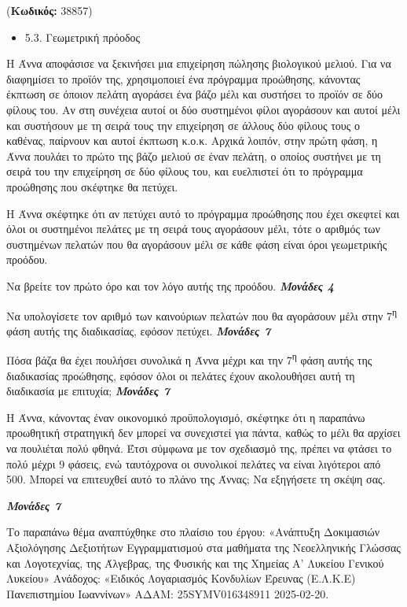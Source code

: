 \documentclass[11pt,a4paper,twoside]{book}
\newcounter{askhsh}[chapter]
\renewcommand{\theaskhsh}{
	\bf{\titlefont{\Large{\thechapter}}.\arabic{askhsh}}
}
\newcommand{\Askhsh}[2]{\refstepcounter{askhsh}{\titlefont{Άσκηση\theaskhsh} - \textcolor{maincolor}{ΘΕΜΑ #2}} ({\small{\textbf{Κωδικός:} #1}})\\}{}
\newenvironment{ylh}{
\begin{tcolorbox}[
breakable,
enhanced standard,
titlerule=0pt,
toprule=0pt, 
rightrule=0pt, 
bottomrule=0pt,
title={\titlefont Ύλη άσκησης},
colback=white,
opacityback=0,
left=2mm,
top=1mm,
bottom=0mm,
boxrule=0pt,
colframe=white,
borderline west={1.5mm}{0pt}{secondarycolor},
leftrule=2mm,
sharp corners,
coltitle=black
]
\begin{itemize}[leftmargin=3mm, itemsep=0mm, label=\textcolor{secondarycolor}{{\small\faBook}}]
}{
\end{itemize}
\end{tcolorbox}
}
\newcommand{\monades}[1]{
\hspace*{\fill}
\textbf{\textit{\textcolor{maincolor}{Μονάδες #1}}}}
\begin{document}
\vspace{4mm}
\Askhsh{38857}{4}
\begin{ylh}
    \item 5.3. Γεωμετρική πρόοδος
\end{ylh}

Η Άννα αποφάσισε να ξεκινήσει μια επιχείρηση πώλησης βιολογικού μελιού. Για να διαφημίσει το προϊόν της, χρησιμοποιεί ένα πρόγραμμα προώθησης, κάνοντας έκπτωση σε όποιον πελάτη αγοράσει ένα βάζο μέλι και συστήσει το προϊόν σε δύο φίλους του. Αν στη συνέχεια αυτοί οι δύο συστημένοι φίλοι αγοράσουν και αυτοί μέλι και συστήσουν με τη σειρά τους την επιχείρηση σε άλλους δύο φίλους τους ο καθένας, παίρνουν και αυτοί έκπτωση κ.ο.κ. Αρχικά λοιπόν, στην πρώτη φάση, η Άννα πουλάει το πρώτο της βάζο μελιού σε έναν πελάτη, ο οποίος συστήνει με τη σειρά του την επιχείρηση σε δύο φίλους του, και ευελπιστεί ότι το πρόγραμμα προώθησης που σκέφτηκε θα πετύχει.

\begin{alist}
\item Η Άννα σκέφτηκε ότι αν πετύχει αυτό το πρόγραμμα προώθησης που έχει σκεφτεί και όλοι οι συστημένοι πελάτες με τη σειρά τους αγοράσουν μέλι, τότε ο αριθμός των συστημένων πελατών που θα αγοράσουν μέλι σε κάθε φάση είναι όροι γεωμετρικής προόδου.

\begin{rlist}
\item
  Να βρείτε τον πρώτο όρο και τον λόγο αυτής της προόδου.\monades{4}

\item
  Να υπολογίσετε τον αριθμό των καινούριων πελατών που θα αγοράσουν μέλι στην 7\textsuperscript{η} φάση αυτής της διαδικασίας, εφόσον πετύχει.\monades{7}

\item
  Πόσα βάζα θα έχει πουλήσει συνολικά η Άννα μέχρι και την 7\textsuperscript{η} φάση αυτής της διαδικασίας προώθησης, εφόσον όλοι οι πελάτες έχουν ακολουθήσει αυτή τη διαδικασία με επιτυχία;\monades{7}
\end{rlist}
\item Η Άννα, κάνοντας έναν οικονομικό προϋπολογισμό, σκέφτηκε ότι η παραπάνω προωθητική στρατηγική δεν μπορεί να συνεχιστεί για πάντα, καθώς το μέλι θα αρχίσει να πουλιέται πολύ φθηνά. Έτσι σύμφωνα με τον σχεδιασμό της, πρέπει να φτάσει το πολύ μέχρι 9 φάσεις, ενώ ταυτόχρονα οι συνολικοί πελάτες να είναι λιγότεροι από 500. Μπορεί να επιτευχθεί αυτό το πλάνο της Άννας; Να εξηγήσετε τη σκέψη σας.
\monades{7}
\end{alist}
{\footnotesize Το παραπάνω θέμα αναπτύχθηκε στο πλαίσιο του έργου: «Ανάπτυξη Δοκιμασιών Αξιολόγησης Δεξιοτήτων Εγγραμματισμού στα μαθήματα της Νεοελληνικής Γλώσσας και Λογοτεχνίας, της Άλγεβρας, της Φυσικής και της Χημείας Α' Λυκείου Γενικού Λυκείου» Ανάδοχος: «Ειδικός Λογαριασμός Κονδυλίων Έρευνας (Ε.Λ.Κ.Ε) Πανεπιστημίου Ιωαννίνων» ΑΔΑΜ: 25SYMV016348911 2025-02-20.}
\end{document}
